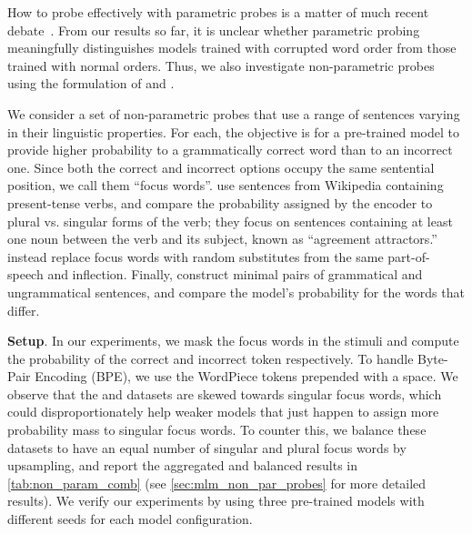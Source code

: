 \documentclass[letterpaper, 12pt]{report}
\newcommand{\xhdr}[1]{{\noindent\bfseries #1}.}
\begin{document}
How to probe effectively with parametric probes is a matter of much recent debate~\citep{hall-maudslay-etal-2020-tale, belinkov2021probing}. From our results so far, it is unclear whether parametric probing meaningfully distinguishes models trained with corrupted word order from those trained with normal orders. Thus, we also investigate non-parametric probes~\cite{linzen-etal-2016-assessing,marvin-linzen-2018-targeted,gulordava2018} using the formulation of \citet{goldberga} and \citet{wolf2019}.%

We consider a set of non-parametric probes that use a range of sentences varying in their linguistic properties. For each, the objective is for a pre-trained model to provide higher probability to a grammatically correct word than to an incorrect one.
Since both the correct and incorrect options occupy the same sentential position, we call them ``focus words''. \citet{linzen-etal-2016-assessing} use sentences from Wikipedia containing present-tense verbs, and compare the probability assigned by the encoder to plural vs. singular forms of the verb; they focus on sentences containing at least one noun between the verb and its subject, known as ``agreement attractors.'' \citet{gulordava2018} instead replace focus words with random substitutes from the same part-of-speech and inflection. Finally, \citet{marvin-linzen-2018-targeted} construct minimal pairs of grammatical and ungrammatical sentences, and compare the model's probability for the words that differ.

\xhdr{Setup} In our experiments, we mask the focus words in the stimuli and compute the probability of the correct and incorrect token respectively.
To handle Byte-Pair Encoding (BPE), we use the WordPiece \cite{wu2016googles} tokens prepended with a space. %
We observe that the \citet{linzen-etal-2016-assessing} and \citet{gulordava2018} datasets are skewed towards singular focus words, which could disproportionately help weaker models that just happen to assign more probability mass to singular focus words. To counter this, we balance these datasets to have an equal number of singular and plural focus words by upsampling, and report the aggregated and balanced results in \autoref{tab:non_param_comb} (see \autoref{sec:mlm_non_par_probes} for more detailed results). We verify our experiments by using three pre-trained models with different seeds for each model configuration.
\end{document}
